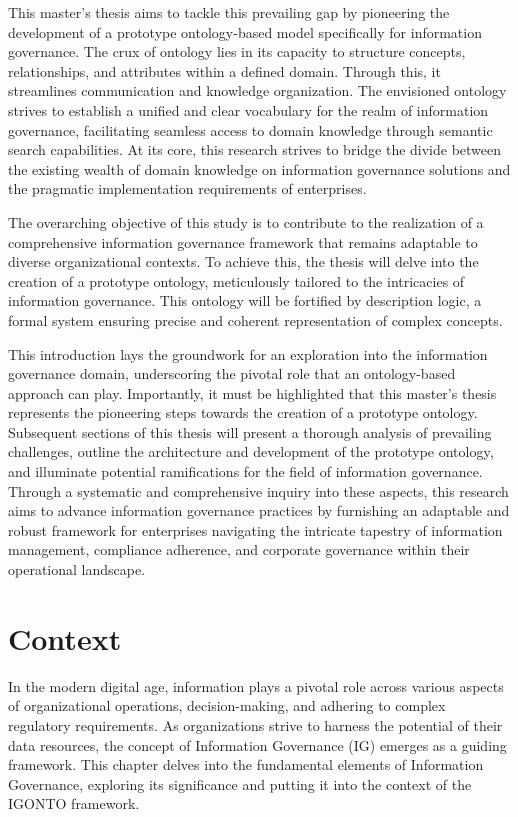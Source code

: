 \documentclass[
  a4paper,  %
  twoside,  %
  bibliography=totoc,
  headsepline,
  cleardoublepage=empty,
  parskip=half,
  draft=false
]{scrbook}
\begin{document}
This master's thesis aims to tackle this prevailing gap by pioneering the development of a prototype ontology-based model specifically for information governance. The crux of ontology lies in its capacity to structure concepts, relationships, and attributes within a defined domain. Through this, it streamlines communication and knowledge organization. The envisioned ontology strives to establish a unified and clear vocabulary for the realm of information governance, facilitating seamless access to domain knowledge through semantic search capabilities. At its core, this research strives to bridge the divide between the existing wealth of domain knowledge on information governance solutions and the pragmatic implementation requirements of enterprises.

The overarching objective of this study is to contribute to the realization of a comprehensive information governance framework that remains adaptable to diverse organizational contexts. To achieve this, the thesis will delve into the creation of a prototype ontology, meticulously tailored to the intricacies of information governance. This ontology will be fortified by description logic, a formal system ensuring precise and coherent representation of complex concepts.

This introduction lays the groundwork for an exploration into the information governance domain, underscoring the pivotal role that an ontology-based approach can play. Importantly, it must be highlighted that this master's thesis represents the pioneering steps towards the creation of a prototype ontology. Subsequent sections of this thesis will present a thorough analysis of prevailing challenges, outline the architecture and development of the prototype ontology, and illuminate potential ramifications for the field of information governance. Through a systematic and comprehensive inquiry into these aspects, this research aims to advance information governance practices by furnishing an adaptable and robust framework for enterprises navigating the intricate tapestry of information management, compliance adherence, and corporate governance within their operational landscape.


\chapter{Context}
In the modern digital age, information plays a pivotal role across various aspects of organizational operations, decision-making, and adhering to complex regulatory requirements. As organizations strive to harness the potential of their data resources, the concept of Information Governance (IG) emerges as a guiding framework. This chapter delves into the fundamental elements of Information Governance, exploring its significance and putting it into the context of the IGONTO framework.
\end{document}
